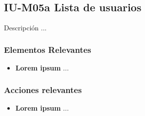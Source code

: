 
\subsection{IU-M05a Lista de usuarios}

 Descripción ...


\subsubsection{Elementos Relevantes}

    \begin{itemize}
    \item {\bf Lorem ipsum}
        ...
    \end{itemize}

\subsubsection{Acciones relevantes}

    \begin{itemize}
    \item {\bf Lorem ipsum}
        ...
    \end{itemize}

\clearpage
